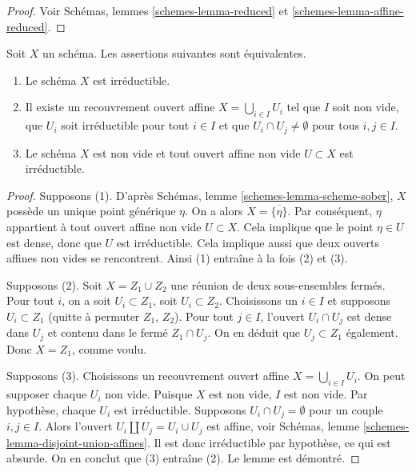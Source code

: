 \begin{proof}
Voir Schémas, lemmes \ref{schemes-lemma-reduced} et
\ref{schemes-lemma-affine-reduced}.
\end{proof}

\begin{lemma}
\label{lemma-characterize-irreducible}
Soit $X$ un schéma.
Les assertions suivantes sont équivalentes.
\begin{enumerate}
\item Le schéma $X$ est irréductible.
\item Il existe un recouvrement ouvert affine $X = \bigcup_{i \in I} U_i$
tel que $I$ soit non vide, que $U_i$ soit irréductible pour tout $i \in I$ et que
$U_i \cap U_j \not = \emptyset$ pour tous $i, j \in I$.
\item Le schéma $X$ est non vide et tout ouvert affine non vide
$U \subset X$ est irréductible.
\end{enumerate}
\end{lemma}

\begin{proof}
Supposons (1). D'après Schémas, lemme \ref{schemes-lemma-scheme-sober},
$X$ possède un unique point générique $\eta$. On a alors
$X = \overline{\{\eta\}}$. Par conséquent, $\eta$ appartient à
tout ouvert affine non vide $U \subset X$. Cela implique
que le point $\eta \in U$ est dense, donc que $U$ est irréductible.
Cela implique aussi que deux ouverts affines non vides se rencontrent.
Ainsi (1) entraîne à la fois (2) et (3).

\medskip\noindent
Supposons (2). Soit $X = Z_1 \cup Z_2$ une réunion de deux sous-ensembles fermés.
Pour tout $i$, on a soit $U_i \subset Z_1$, soit $U_i \subset Z_2$.
Choisissons un $i \in I$ et supposons $U_i \subset Z_1$ (quitte à permuter
$Z_1$, $Z_2$). Pour tout $j \in I$, l'ouvert $U_i \cap U_j$ est dense dans
$U_j$ et contenu dans le fermé $Z_1 \cap U_j$. On en déduit que
$U_j \subset Z_1$ également. Donc $X = Z_1$, comme voulu.

\medskip\noindent
Supposons (3). Choisissons un recouvrement ouvert affine $X = \bigcup_{i \in I} U_i$.
On peut supposer chaque $U_i$ non vide.
Puisque $X$ est non vide, $I$ est non vide.
Par hypothèse, chaque $U_i$ est irréductible.
Supposons $U_i \cap U_j = \emptyset$ pour un couple $i, j \in I$.
Alors l'ouvert $U_i \amalg  U_j = U_i \cup U_j$ est affine, voir
Schémas, lemme \ref{schemes-lemma-disjoint-union-affines}.
Il est donc irréductible par hypothèse, ce qui est absurde. On en conclut que (3)
entraîne (2). Le lemme est démontré.
\end{proof}

